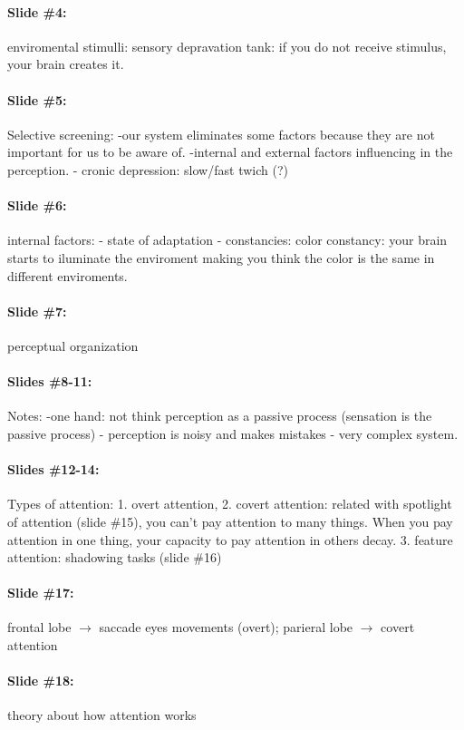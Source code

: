 \documentclass[12pt,article,oneside,a4paper]{memoir}
\begin{document}
\paragraph{Slide \#4:} enviromental stimulli: sensory depravation tank: if you do not receive stimulus, your brain creates it.
\paragraph{Slide \#5:} Selective screening: -our system eliminates some factors because they are not important for us to be aware of. -internal and external factors influencing in the perception. - cronic depression: slow/fast twich (?)
\paragraph{Slide \#6:} internal factors: - state of adaptation - constancies: color constancy: your brain starts to iluminate the enviroment making you think the color is the same in different enviroments.
\paragraph{Slide \#7:} perceptual organization

\paragraph{Slides \#8-11:} Notes: -one hand: not think perception as a passive process (sensation is the passive process) - perception is noisy and makes mistakes - very complex system.

\paragraph{Slides \#12-14:} Types of attention: 1. overt attention, 2. covert attention: related with spotlight of attention (slide \#15), you can't pay attention to many things. When you pay attention in one thing, your capacity to pay attention in others decay. 3. feature attention: shadowing tasks (slide \#16)

\paragraph{Slide \#17:} frontal lobe $\rightarrow$ saccade eyes movements (overt); parieral lobe $\rightarrow$ covert attention
\paragraph{Slide \#18:} theory about how attention works
\end{document}
